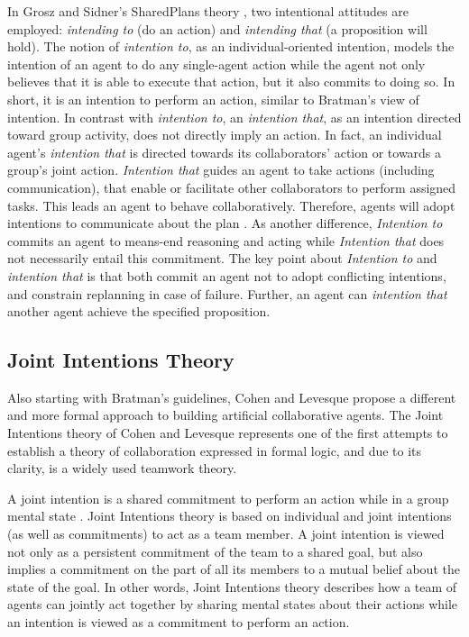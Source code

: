 \documentclass[12pt]{report}
\begin{document}
In Grosz and Sidner's SharedPlans theory \cite{grosz:plans-discourse}, two
intentional attitudes are employed: \textit{intending to} (do an action) and
\textit{intending that} (a proposition will hold). The notion of
\textit{intention to}, as an individual-oriented intention, models the intention
of an agent to do any single-agent action while the agent not only believes that
it is able to execute that action, but it also commits to doing so. In short,
it is an intention to perform an action, similar to Bratman's view of intention.
In contrast with \textit{intention to}, an \textit{intention that}, as an
intention directed toward group activity, does not directly imply an action. In
fact, an individual agent's \textit{intention that} is directed towards its
collaborators' action or towards a group's joint action. \textit{Intention that}
guides an agent to take actions (including communication), that enable or
facilitate other collaborators to perform assigned tasks. This leads an agent to
behave collaboratively. Therefore, agents will adopt intentions to communicate
about the plan \cite{grosz:collaboration}. As another difference,
\textit{Intention to} commits an agent to means-end reasoning and acting
\cite{bratman:intentions-plans} while \textit{Intention that} does not
necessarily entail this commitment. The key point about \textit{Intention to}
and \textit{intention that} is that both commit an agent not to adopt
conflicting intentions, and constrain replanning in case of failure. Further, an
agent can \textit{intention that} another agent achieve the specified
proposition.

\subsection{Joint Intentions Theory}
\label{sec:joint-intentions}

Also starting with Bratman's guidelines, Cohen and Levesque propose a different
and more formal approach to building artificial collaborative agents. The Joint
Intentions theory of Cohen and Levesque \cite{cohen:teamwork,
cohen:intention-commitment, cohen:persistence-intention-commitment,
cohen:intentions, levesque:acting-together} represents one of the first attempts
to establish a theory of collaboration expressed in formal logic, and due to its
clarity, is a widely used teamwork theory.

A joint intention is a shared commitment to perform an action while in a group
mental state \cite{cohen:intention-commitment}. Joint Intentions theory is based
on individual and joint intentions (as well as commitments) to act as a team
member. A joint intention is viewed not only as a persistent commitment of the
team to a shared goal, but also implies a commitment on the part of all its
members to a mutual belief about the state of the goal. In other words, Joint
Intentions theory describes how a team of agents can jointly act together by
sharing mental states about their actions while an intention is viewed as a
commitment to perform an action.
\end{document}
